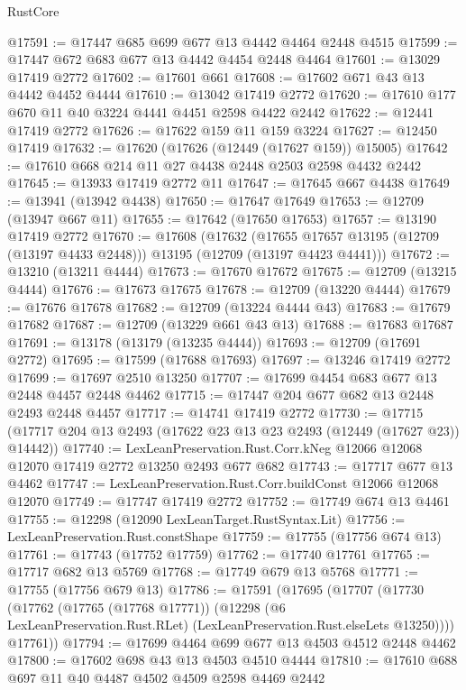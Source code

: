 \begin{lexlean}{RustCore}
\begin{coremodule}
@17591 := @17447 @685 @699 @677 @13 @4442 @4464 @2448 @4515
@17599 := @17447 @672 @683 @677 @13 @4442 @4454 @2448 @4464
@17601 := @13029 @17419 @2772
@17602 := @17601 @661
@17608 := @17602 @671 @43 @13 @4442 @4452 @4444
@17610 := @13042 @17419 @2772
@17620 := @17610 @177 @670 @11 @40 @3224 @4441 @4451 @2598 @4422 @2442
@17622 := @12441 @17419 @2772
@17626 := @17622 @159 @11 @159 @3224
@17627 := @12450 @17419
@17632 := @17620 (@17626 (@12449 (@17627 @159)) @15005)
@17642 := @17610 @668 @214 @11 @27 @4438 @2448 @2503 @2598 @4432 @2442
@17645 := @13933 @17419 @2772 @11
@17647 := @17645 @667 @4438
@17649 := @13941 (@13942 @4438)
@17650 := @17647 @17649
@17653 := @12709 (@13947 @667 @11)
@17655 := @17642 (@17650 @17653)
@17657 := @13190 @17419 @2772
@17670 := @17608
    (@17632
      (@17655 @17657 @13195 (@12709 (@13197 @4433 @2448)))
      @13195
      (@12709 (@13197 @4423 @4441)))
@17672 := @13210 (@13211 @4444)
@17673 := @17670 @17672
@17675 := @12709 (@13215 @4444)
@17676 := @17673 @17675
@17678 := @12709 (@13220 @4444)
@17679 := @17676 @17678
@17682 := @12709 (@13224 @4444 @43)
@17683 := @17679 @17682
@17687 := @12709 (@13229 @661 @43 @13)
@17688 := @17683 @17687
@17691 := @13178 (@13179 (@13235 @4444))
@17693 := @12709 (@17691 @2772)
@17695 := @17599 (@17688 @17693)
@17697 := @13246 @17419 @2772
@17699 := @17697 @2510 @13250
@17707 := @17699 @4454 @683 @677 @13 @2448 @4457 @2448 @4462
@17715 := @17447 @204 @677 @682 @13 @2448 @2493 @2448 @4457
@17717 := @14741 @17419 @2772
@17730 := @17715 (@17717 @204 @13 @2493 (@17622 @23 @13 @23 @2493 (@12449 (@17627 @23)) @14442))
@17740 := LexLeanPreservation.Rust.Corr.kNeg
    @12066
    @12068
    @12070
    @17419
    @2772
    @13250
    @2493
    @677
    @682
@17743 := @17717 @677 @13 @4462
@17747 := LexLeanPreservation.Rust.Corr.buildConst @12066 @12068 @12070
@17749 := @17747 @17419 @2772
@17752 := @17749 @674 @13 @4461
@17755 := @12298 (@12090 LexLeanTarget.RustSyntax.Lit)
@17756 := LexLeanPreservation.Rust.constShape
@17759 := @17755 (@17756 @674 @13)
@17761 := @17743 (@17752 @17759)
@17762 := @17740 @17761
@17765 := @17717 @682 @13 @5769
@17768 := @17749 @679 @13 @5768
@17771 := @17755 (@17756 @679 @13)
@17786 := @17591
    (@17695
      (@17707
        (@17730
          (@17762
            (@17765 (@17768 @17771))
            (@12298 (@6 LexLeanPreservation.Rust.RLet) (LexLeanPreservation.Rust.elseLets @13250))))
        @17761))
@17794 := @17699 @4464 @699 @677 @13 @4503 @4512 @2448 @4462
@17800 := @17602 @698 @43 @13 @4503 @4510 @4444
@17810 := @17610 @688 @697 @11 @40 @4487 @4502 @4509 @2598 @4469 @2442

\end{coremodule}
\end{lexlean}
